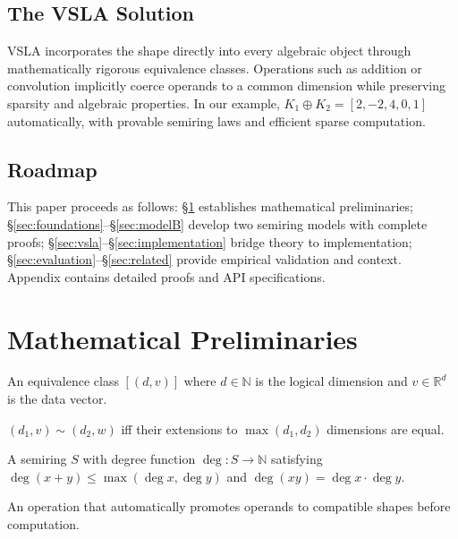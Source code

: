 \documentclass[sigconf,review]{acmart}
\begin{document}
\subsection{The VSLA Solution}
VSLA incorporates the shape directly into every algebraic object through mathematically rigorous equivalence classes.  Operations such as addition or convolution implicitly coerce operands to a common dimension while preserving sparsity and algebraic properties. In our example, $K_1 \oplus K_2 = [2, -2, 4, 0, 1]$ automatically, with provable semiring laws and efficient sparse computation.

\subsection{Roadmap}
This paper proceeds as follows: §\ref{sec:prelim} establishes mathematical preliminaries; §\ref{sec:foundations}–§\ref{sec:modelB} develop two semiring models with complete proofs; §\ref{sec:vsla}–§\ref{sec:implementation} bridge theory to implementation; §\ref{sec:evaluation}–§\ref{sec:related} provide empirical validation and context. Appendix contains detailed proofs and API specifications.

\section{Mathematical Preliminaries}
\label{sec:prelim}

\begin{tcolorbox}[colback=prelim,colframe=blue!50!black,title=Key Definitions]
\begin{description}[leftmargin=2em]
\item[Dimension-aware vector:] An equivalence class $[(d,v)]$ where $d \in \mathbb{N}$ is the logical dimension and $v \in \mathbb{R}^d$ is the data vector.
\item[Zero-padding equivalence:] $(d_1,v) \sim (d_2,w)$ iff their extensions to $\max(d_1,d_2)$ dimensions are equal.
\item[Shape-semiring:] A semiring $S$ with degree function $\deg: S \to \mathbb{N}$ satisfying $\deg(x+y) \leq \max(\deg x, \deg y)$ and $\deg(xy) = \deg x \cdot \deg y$.
\item[Variable-shape operation:] An operation that automatically promotes operands to compatible shapes before computation.
\end{description}
\end{tcolorbox}
\end{document}
